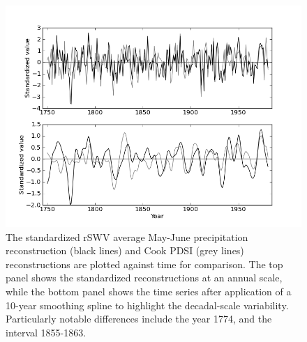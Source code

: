
\begin{figure}
\centering
\includegraphics[width=5in]{figures/reconCompare.png}
\caption{The standardized rSWV average May-June precipitation reconstruction (black lines) and Cook PDSI (grey lines) reconstructions are plotted against time for comparison. The top panel shows the standardized reconstructions at an annual scale, while the bottom panel shows the time series after application of a 10-year smoothing spline to highlight the decadal-scale variability. Particularly notable differences include the year 1774, and the interval 1855-1863.}
\label{fig:reconCompare}
\end{figure}


